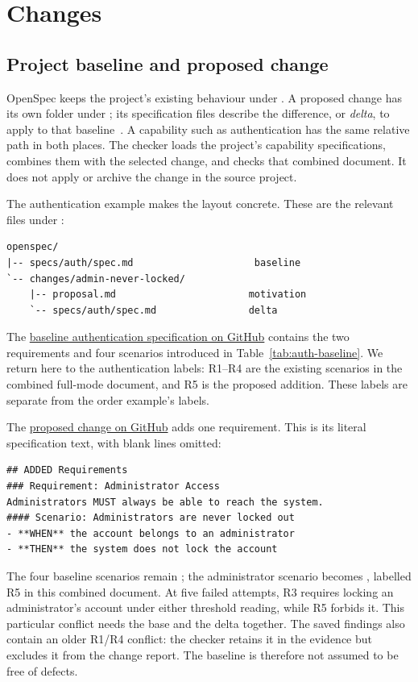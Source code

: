 \section{Changes}\label{sec:change}

\subsection{Project baseline and proposed change}

OpenSpec keeps the project's existing behaviour under . A proposed change has its own folder under ; its specification files describe the difference, or \emph{delta}, to apply to that baseline~\citep{openspec}. A capability such as authentication has the same relative path in both places. The checker loads the project's capability specifications, combines them with the selected change, and checks that combined document. It does not apply or archive the change in the source project.

The authentication example makes the layout concrete. These are the relevant files under :
\begin{lstlisting}
openspec/
|-- specs/auth/spec.md                     baseline
`-- changes/admin-never-locked/
    |-- proposal.md                       motivation
    `-- specs/auth/spec.md                delta
\end{lstlisting}

The \href{\authbaseurl}{baseline authentication specification on GitHub} contains the two requirements and four scenarios introduced in Table~\ref{tab:auth-baseline}. We return here to the authentication labels: R1--R4 are the existing scenarios in the combined full-mode document, and R5 is the proposed addition. These labels are separate from the order example's labels.

The \href{\authchangeurl}{proposed change on GitHub} adds one requirement. This is its literal specification text, with blank lines omitted:
\begin{lstlisting}
## ADDED Requirements
### Requirement: Administrator Access
Administrators MUST always be able to reach the system.
#### Scenario: Administrators are never locked out
- **WHEN** the account belongs to an administrator
- **THEN** the system does not lock the account
\end{lstlisting}

The four baseline scenarios remain ; the administrator scenario becomes , labelled R5 in this combined document. At five failed attempts, R3 requires locking an administrator's account under either threshold reading, while R5 forbids it. This particular conflict needs the base and the delta together. The saved findings also contain an older R1/R4 conflict: the checker retains it in the evidence but excludes it from the change report. The baseline is therefore not assumed to be free of defects.

